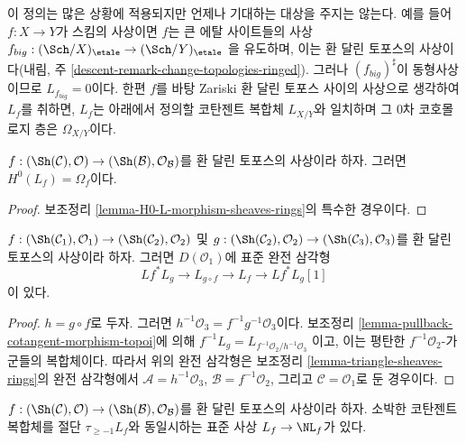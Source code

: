 \noindent
이 정의는 많은 상황에 적용되지만 언제나 기대하는 대상을 주지는 않는다.
예를 들어 $f : X \to Y$가 스킴의 사상이면 $f$는 큰 에탈 사이트들의 사상
$f_{big} : (\Sch/X)_\etale \to (\Sch/Y)_\etale$
을 유도하며, 이는 환 달린 토포스의 사상이다(내림, 주
\ref{descent-remark-change-topologies-ringed}). 그러나
$(f_{big})^\sharp$이 동형사상이므로 $L_{f_{big}} = 0$이다. 한편 $f$를 바탕
Zariski 환 달린 토포스 사이의 사상으로 생각하여 $L_f$를 취하면, $L_f$는
아래에서 정의할 코탄젠트 복합체 $L_{X/Y}$와 일치하며 그 0차 코호몰로지
층은 $\Omega_{X/Y}$이다.

\begin{lemma}
\label{lemma-H0-L-morphism-ringed-topoi}
$f : (\Sh(\mathcal{C}), \mathcal{O}) \to
(\Sh(\mathcal{B}), \mathcal{O}_\mathcal{B})$를 환 달린 토포스의 사상이라
하자. 그러면 $H^0(L_f) = \Omega_f$이다.
\end{lemma}

\begin{proof}
보조정리 \ref{lemma-H0-L-morphism-sheaves-rings}의 특수한 경우이다.
\end{proof}

\begin{lemma}
\label{lemma-triangle-ringed-topoi}
$f : (\Sh(\mathcal{C}_1), \mathcal{O}_1) \to
(\Sh(\mathcal{C}_2), \mathcal{O}_2)$ 및
$g : (\Sh(\mathcal{C}_2), \mathcal{O}_2) \to
(\Sh(\mathcal{C}_3), \mathcal{O}_3)$를 환 달린 토포스의 사상이라 하자.
그러면 $D(\mathcal{O}_1)$에 표준 완전 삼각형
$$
Lf^* L_g \to L_{g \circ f} \to L_f \to Lf^*L_g[1]
$$
이 있다.
\end{lemma}

\begin{proof}
$h = g \circ f$로 두자. 그러면
$h^{-1}\mathcal{O}_3 = f^{-1}g^{-1}\mathcal{O}_3$이다. 보조정리
\ref{lemma-pullback-cotangent-morphism-topoi}에 의해
$f^{-1}L_g = L_{f^{-1}\mathcal{O}_2/h^{-1}\mathcal{O}_3}$
이고, 이는 평탄한 $f^{-1}\mathcal{O}_2$-가군들의 복합체이다. 따라서 위의
완전 삼각형은 보조정리 \ref{lemma-triangle-sheaves-rings}의 완전 삼각형에서
$\mathcal{A} = h^{-1}\mathcal{O}_3$, $\mathcal{B} = f^{-1}\mathcal{O}_2$,
그리고 $\mathcal{C} = \mathcal{O}_1$로 둔 경우이다.
\end{proof}

\begin{lemma}
\label{lemma-compare-cotangent-complex-with-naive-ringed-topoi}
$f : (\Sh(\mathcal{C}), \mathcal{O}) \to
(\Sh(\mathcal{B}), \mathcal{O}_\mathcal{B})$를 환 달린 토포스의 사상이라
하자. 소박한 코탄젠트 복합체를 절단 $\tau_{\geq -1}L_f$와 동일시하는
표준 사상 $L_f \to \NL_f$가 있다.
\end{lemma}

